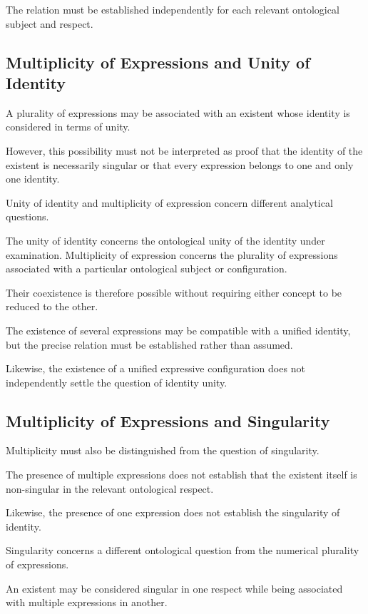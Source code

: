 The relation must be established independently
for each relevant ontological subject and respect.

\subsection{Multiplicity of Expressions and Unity of Identity}

A plurality of expressions may be associated
with an existent whose identity is considered
in terms of unity.

However, this possibility must not be interpreted
as proof that the identity of the existent is
necessarily singular or that every expression
belongs to one and only one identity.

Unity of identity and multiplicity of expression
concern different analytical questions.

The unity of identity concerns the ontological
unity of the identity under examination.
Multiplicity of expression concerns the plurality
of expressions associated with a particular
ontological subject or configuration.

Their coexistence is therefore possible without
requiring either concept to be reduced to the other.

The existence of several expressions may be
compatible with a unified identity, but the
precise relation must be established rather
than assumed.

Likewise, the existence of a unified expressive
configuration does not independently settle
the question of identity unity.

\subsection{Multiplicity of Expressions and Singularity}

Multiplicity must also be distinguished from
the question of singularity.

The presence of multiple expressions does
not establish that the existent itself is
non-singular in the relevant ontological respect.

Likewise, the presence of one expression does
not establish the singularity of identity.

Singularity concerns a different ontological
question from the numerical plurality of
expressions.

An existent may be considered singular in
one respect while being associated with
multiple expressions in another.

